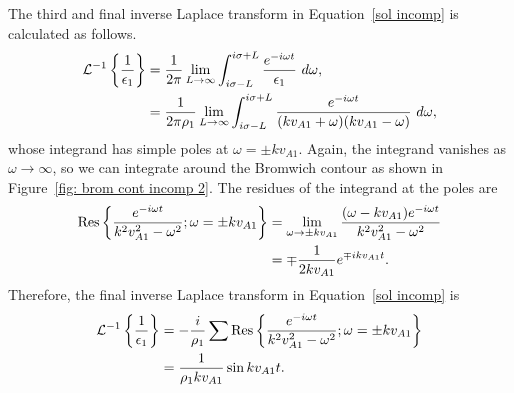 \documentclass[12pt]{../style-files/ociamthesis}
\begin{document}
The third and final inverse Laplace transform in Equation~\eqref{sol incomp} is calculated as follows.
\begin{align}
\mathcal{L}^{-1}\left\{ \frac{1}{\epsilon_1} \right\} &= \frac{1}{2\pi}\lim_{L \to \infty} \int_{i\sigma - L}^{i\sigma + L} \frac{e^{-i\omega t}}{\epsilon_1} ~d\omega, \notag \\
&= \frac{1}{2\pi\rho_1}\lim_{L \to \infty} \int_{i\sigma - L}^{i\sigma + L} \frac{e^{-i\omega t}}{(kv_{A1} + \omega)(kv_{A1} - \omega)} ~d\omega,
\end{align}
whose integrand has simple poles at $\omega = \pm k v_{A1}$. Again, the integrand vanishes as $\omega \to \infty$, so we can integrate around the Bromwich contour as shown in Figure~\ref{fig: brom cont incomp 2}. The residues of the integrand at the poles are
\begin{align}
\mathrm{Res}\left\{\frac{e^{-i\omega t}}{k^2v_{A1}^2 - \omega^2}; \omega = \pm kv_{A1} \right\} &= 
\lim_{\omega \to \pm kv_{A1}} \frac{(\omega - kv_{A1}) e^{-i\omega t}}{k^2v_{A1}^2 - \omega^2} \notag \\ 
&= \mp \frac{1}{2kv_{A1}} e^{\mp ikv_{A1} t}.
\end{align}
Therefore, the final inverse Laplace transform in Equation~\eqref{sol incomp} is
\begin{align}
\mathcal{L}^{-1}\left\{ \frac{1}{\epsilon_1} \right\} &= -\frac{i}{\rho_1} \sum \mathrm{Res} \left\{ \frac{e^{-i\omega t}}{k^2v_{A1}^2 - \omega^2}; \omega = \pm kv_{A1} \right\} \notag \\
&= \frac{1}{\rho_1kv_{A1}} \sin{kv_{A1}t}.
\end{align}
\end{document}
